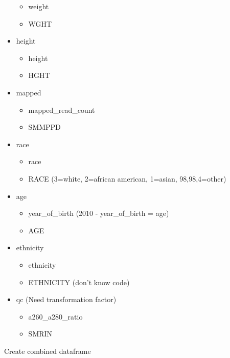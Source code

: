 \documentclass[11pt]{article}
\providecommand{\tightlist}{%
      \setlength{\itemsep}{0pt}\setlength{\parskip}{0pt}}
\begin{document}
\begin{itemize}
  \begin{itemize}
  \tightlist
  \item
    weight
  \item
    WGHT
  \end{itemize}
\item
  height

  \begin{itemize}
  \tightlist
  \item
    height
  \item
    HGHT
  \end{itemize}
\item
  mapped

  \begin{itemize}
  \tightlist
  \item
    mapped\_read\_count
  \item
    SMMPPD
  \end{itemize}
\item
  race

  \begin{itemize}
  \tightlist
  \item
    race
  \item
    RACE (3=white, 2=african american, 1=asian, 98,98,4=other)
  \end{itemize}
\item
  age

  \begin{itemize}
  \tightlist
  \item
    year\_of\_birth (2010 - year\_of\_birth = age)
  \item
    AGE
  \end{itemize}
\item
  ethnicity

  \begin{itemize}
  \tightlist
  \item
    ethnicity
  \item
    ETHNICITY (don't know code)
  \end{itemize}
\item
  qc (Need transformation factor)

  \begin{itemize}
  \tightlist
  \item
    a260\_a280\_ratio
  \item
    SMRIN
  \end{itemize}
\end{itemize}

    Create combined dataframe
\end{document}
